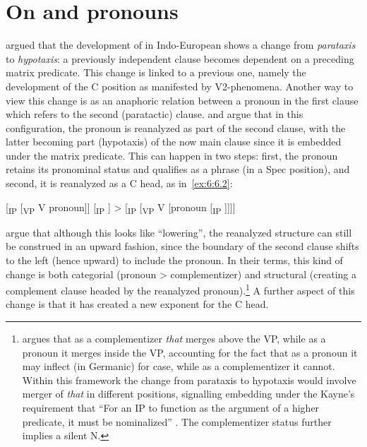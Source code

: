 \documentclass[output=paper]{langsci/langscibook}
\begin{document}
\section{On  and pronouns}\label{sec:comp-pron}

\citet{Kiparsky1995} argued that the development of  in
Indo-Eu\-ro\-pean shows a change from \emph{parataxis} to \emph{hypotaxis}: a
previously independent clause becomes dependent on a preceding matrix
predicate. This change is linked to a previous one, namely the development of
the C position as manifested by V2-phenomena. Another way to view this change
is as an anaphoric relation between a pronoun in the first clause which refers
to the second (paratactic) clause. \citet{RobRou2003} and
\citet{vanGelderen2004} argue that in this configuration, the pronoun is
reanalyzed as part of the second clause, with the latter becoming part
(hypotaxis) of the now main clause since it is embedded under the matrix
predicate. This can happen in two steps: first, the pronoun retains its
pronominal status and qualifies as a phrase (in a Spec position), and second,
it is reanalyzed as a C head, as in~\eqref{ex:6:6.2}:

\ea\label{ex:6:6.2}
   [\textsubscript{IP} [\textsubscript{VP} V pronoun]] [\textsubscript{IP} ] > [\textsubscript{IP} [\textsubscript{VP} V [pronoun [\textsubscript{IP} ]]]]
\z

\citet[118]{RobRou2003} argue that although this looks like \enquote{lowering},
the reanalyzed structure can still be construed in an upward fashion, since the
boundary of the second clause shifts to the left (hence upward) to include the
pronoun. In their terms, this kind of change is both categorial (pronoun > complementizer) and structural (creating a complement
clause headed by the reanalyzed pronoun).\footnote{\citet[238]{Kayne2005b}
    argues that as a complementizer \emph{that} merges
    above the VP, while as a pronoun it merges inside the VP, accounting for
    the fact that as a pronoun it may inflect (in Germanic) for case, while as
    a complementizer it cannot.  Within this framework the
    change from parataxis to hypotaxis would involve merger of \emph{that} in
    different positions, signalling embedding under the Kayne’s requirement
that \enquote{For an IP to function as the argument of a higher predicate, it
must be nominalized} \parencite[236]{Kayne2005b}.  The
complementizer status further implies a silent
N.\label{fn:4.2}} A
further aspect of this change is that it has created a new exponent for the C
head.
\end{document}
